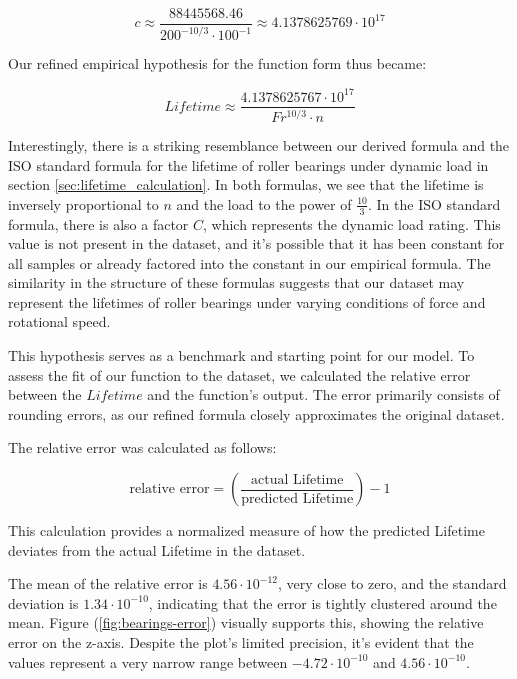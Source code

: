 \begin{equation}
\label{eq:constant_c}
c \approx \frac{88445568.46}{200^{-10/3} \cdot 100^{-1}} \approx 4.1378625769 \cdot 10^{17}
\end{equation}

Our refined empirical hypothesis for the function form thus became:

\begin{equation}
\label{eq:refined_hypothesis}
Lifetime \approx \frac{4.1378625767 \cdot 10^{17}}{Fr^{10/3} \cdot n}
\end{equation}

Interestingly, there is a striking resemblance between our derived formula and the ISO standard formula for the lifetime of roller bearings under dynamic load in section \ref{sec:lifetime_calculation}. In both formulas, we see that the lifetime is inversely proportional to \(n\) and the load to the power of \(\frac{10}{3}\). In the ISO standard formula, there is also a factor \(C\), which represents the dynamic load rating. This value is not present in the dataset, and it's possible that it has been constant for all samples or already factored into the constant in our empirical formula. The similarity in the structure of these formulas suggests that our dataset may represent the lifetimes of roller bearings under varying conditions of force and rotational speed.

This hypothesis serves as a benchmark and starting point for our model. To assess the fit of our function to the dataset, we calculated the relative error between the \(Lifetime\) and the function's output. The error primarily consists of rounding errors, as our refined formula closely approximates the original dataset.

The relative error was calculated as follows:

\begin{equation}
\text{relative error} = \left(\frac{\text{actual Lifetime}}{\text{predicted Lifetime}}\right) - 1
\end{equation}

This calculation provides a normalized measure of how the predicted Lifetime deviates from the actual Lifetime in the dataset.

The mean of the relative error is \(4.56 \cdot 10^{-12}\), very close to zero, and the standard deviation is \(1.34 \cdot 10^{-10}\), indicating that the error is tightly clustered around the mean. Figure (\ref{fig:bearings-error}) visually supports this, showing the relative error on the z-axis. Despite the plot's limited precision, it's evident that the values represent a very narrow range between \(-4.72 \cdot 10^{-10}\) and \(4.56 \cdot 10^{-10}\).

